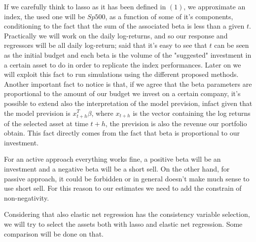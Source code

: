 \documentclass{article}%
\begin{document}
If we carefully think to lasso as it has been defined in $(1)$, we approximate an index, the used one will be $Sp500$, as a function of some of it's components, conditioning to the fact that the sum of the associated beta is less than a given $t$. Practically we will work on the daily log-returns, and so our response and regressors will be all daily log-return; said that it's easy to see that $t$ can be seen as the initial budget and each beta is the volume of the "suggested" investment in a certain asset to do in order to replicate the index performances. Later on we will exploit this fact to run simulations using the different proposed methods.
Another important fact to notice is that, if we agree that the beta parameters are proportional to the amount of our budget we invest on a certain company, it's possible to extend also the interpretation of the model prevision, infact given that the model prevision is $ x_{t+h}^T \beta$, where $x_{t+h}$ is the vector containing the log returns of the selected asset at time $t+h$, the prevision is also the revenue our portfolio obtain. This fact directly comes from the fact that beta is proportional to our investment. 

For an active approach everything works fine, a positive beta will be an investment and a negative beta will be a short sell. On the other hand, for passive approach, it could be forbidden or in general doesn't make much sense to use short sell. For this reason to our estimates we need to add the constrain of non-negativity.

Considering that also elastic net regression has the consistency variable selection, we will try to select the assets both with lasso and elastic net regression. Some comparison will be done on that.
\end{document}
